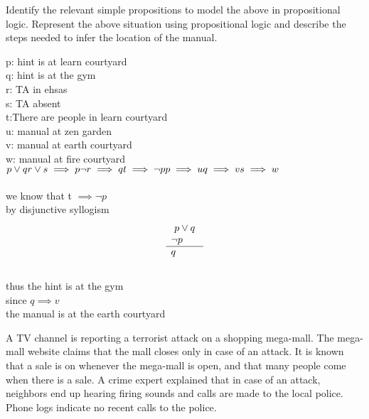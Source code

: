 \documentclass[addpoints]{exam}
\begin{document}
\begin{questions}
  Identify the relevant simple propositions to model the above in propositional logic. Represent the above situation using propositional logic and describe the steps needed to infer the location of the manual.
  \begin{solution}
    p: hint is at learn courtyard
    \\ q: hint is at the gym
    \\ r: TA in ehsas
    \\ s: TA absent
    \\ t:There are people in learn courtyard
    \\ u: manual at zen garden
    \\ v: manual at earth courtyard
    \\ w: manual at fire courtyard
    \\
  $  \\ p \vee  q
\\ r\vee s \implies p
\\\neg r \implies q
\\ t \implies \neg p
\\ p \implies u
\\ q \implies v
\\ s \implies w
$
\\
\\we know that t $\implies \neg p$
\\ by disjunctive syllogism
\\ 
\[
        \begin{array}{l}
          \text{ $ p \vee q $ }\\
          \text{$\neg p$}\\\hline
          \text{$ q$}\\
        \end{array}
      \]
\\ thus the hint is at the gym
\\ since $q \implies v$ 
\\ the manual is at the earth courtyard

  \end{solution}

\question[5] A TV channel is reporting a terrorist attack on a shopping mega-mall. The mega-mall website claims that the mall closes only in case of an attack. It is known that a sale is on whenever the mega-mall is open, and that many people come when there is a sale. A crime expert explained that in case of an attack, neighbors end up hearing firing sounds and calls are made to the local police. Phone logs indicate no recent calls to the police.
  \begin{parts}

\end{parts}
\end{questions}
\end{document}
